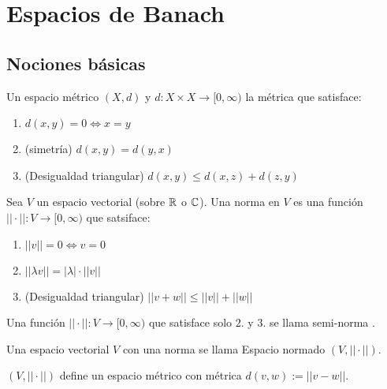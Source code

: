 \chapter{Espacios de Banach}

\section{Nociones básicas}

\begin{fdefinition}
    Un espacio métrico $(X,d)$ y $d:X\times X\to [0,\infty)$ la métrica que satisface:

    \begin{enumerate}
        \item $d(x,y)=0\iff x=y$
        \item (simetría) $d(x,y)=d(y,x)$
        \item (Desigualdad triangular) $d(x,y)\leq d(x,z)+d(z,y)$
    \end{enumerate}
\end{fdefinition}

\begin{fdefinition}[]
    Sea $V$ un espacio vectorial (sobre $\mathbb{R}$ o $\mathbb{C}$). Una norma en $V$ es una función $||\cdot||:V\to [0,\infty)$ que satsiface:

    \begin{enumerate}
        \item $||v||=0\iff v=0$
        \item $||\lambda v||=|\lambda|\cdot ||v||$
        \item (Desigualdad triangular) $||v+w||\leq ||v||+||w||$
    \end{enumerate}
\end{fdefinition}

Una función $||\cdot||:V\to[0,\infty)$ que satisface solo $2.$ y $3.$ se llama \color{red} semi-norma \color{black}.

Una espacio vectorial $V$ con una norma se llama \color{red} Espacio normado \color{black} $(V,||\cdot||)$.

\begin{fproposition}
    $(V,||\cdot||)$ define un espacio métrico con métrica $d(v,w):=||v-w||$.
\end{fproposition}

